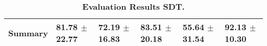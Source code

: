 \begin{table}[htb]
{\begin{tabular}{llllll}
\midrule
\textbf{Summary                                  } &                  \phantom{0}81.78 $\pm$ 22.77 &                      \phantom{0}72.19 $\pm$ 16.83 &                  \phantom{0}83.51 $\pm$ 20.18 &                  \phantom{0}55.64 $\pm$ 31.54 &            \phantom{0}92.13 $\pm$ 10.30 \\
\bottomrule
\end{tabular}%
}
\caption{\textbf{Evaluation Results SDT.}}
\label{tab:eval-results}
\end{table}
\newpage 
